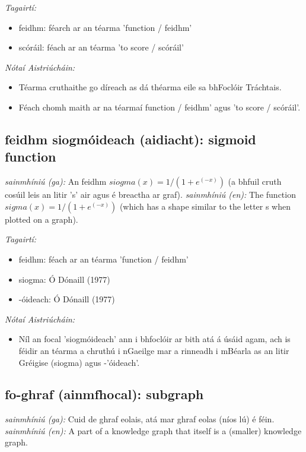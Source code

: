 \documentclass{article}
\begin{document}
 \noindent \textit{Tagairtí:}
\begin{itemize}
	\item feidhm: féarch ar an téarma 'function / feidhm'
	\item scóráil: féach ar an téarma 'to score / scóráil'
\end{itemize}

 \noindent \textit{Nótaí Aistriúcháin:}
\begin{itemize}
	\item Téarma cruthaithe go díreach as dá théarma eile sa bhFoclóir Tráchtais.
	\item Féach chomh maith ar na téarmaí function / feidhm' agus 'to score / scóráil'.
\end{itemize}


\subsection*{feidhm siogmóideach (aidiacht): sigmoid function} 
 \noindent \textit{sainmhíniú (ga):} An feidhm $siogma(x) = 1 / (1 + e^(-x))$ (a bhfuil cruth cosúil leis an litir 's' air agus é breactha ar graf).
\newline\newline
 \noindent \textit{sainmhíniú (en):} The function $sigma(x) = 1 / (1 + e^(-x))$ (which has a shape similar to the letter s when plotted on a graph).
\newline

 \noindent \textit{Tagairtí:}
\begin{itemize}
	\item feidhm: féach ar an téarma 'function / feidhm'
	\item siogma: Ó Dónaill (1977) \cite{odonaill}
	\item -óideach: Ó Dónaill (1977) \cite{odonaill}
\end{itemize}

 \noindent \textit{Nótaí Aistriúcháin:}
\begin{itemize}
	\item Níl an focal 'siogmóideach' ann i bhfoclóir ar bith atá á úsáid agam, ach is féidir an téarma a chruthú i nGaeilge mar a rinneadh i mBéarla as an litir Gréigise (siogma) agus -'óideach'.
\end{itemize}


\subsection*{fo-ghraf (ainmfhocal): subgraph} 
 \noindent \textit{sainmhíniú (ga):} Cuid de ghraf eolais, atá mar ghraf eolas (níos lú) é féin.
\newline\newline
 \noindent \textit{sainmhíniú (en):} A part of a knowledge graph that itself is a (smaller) knowledge graph.
\newline
\end{document}
